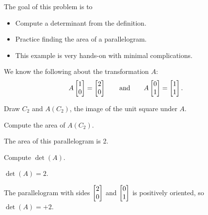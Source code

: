 \documentclass{problemset}
\begin{document}
	\question
	\begin{annotation}
		\begin{goals}

			The goal of this problem is to
			\begin{itemize}
				\item Compute a determinant from the definition.
				\item Practice finding the area of a parallelogram.
			\end{itemize}
		\end{goals}

		\begin{notes}
			\begin{itemize}
				\item This example is very hands-on with minimal complications.
			\end{itemize}
		\end{notes}
	\end{annotation}
	We know the following about the transformation $A$:
	\[
		A\mat{1\\0}=\mat{2\\0}\qquad\text{and}\qquad A\mat{0\\1}=\mat{1\\1}.
	\]
	\begin{parts}
		\item Draw $C_2$ and $A(C_2)$, the image of the unit square
			under $A$.
			\begin{solution}
			\end{solution}
		\item Compute the area of $A(C_2)$.
			\begin{solution}[inline]
				The area of this parallelogram is 2.
			\end{solution}
		\item Compute $\det(A)$.
			\begin{solution}
				$\det(A)=2$.

				The parallelogram with sides $\mat{2\\0}$ and $\mat{0\\1}$ is
				positively oriented, so $\det(A)=+2$.
			\end{solution}
	\end{parts}
\end{document}
